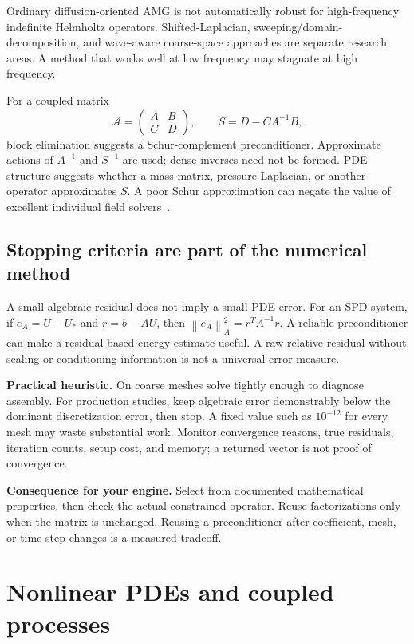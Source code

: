 \documentclass[11pt,a4paper]{article}
\newcommand{\norm}[1]{\left\lVert #1\right\rVert}
\newcommand{\decision}[1]{\par\smallskip\noindent\textcolor{accent}{\textbf{Consequence for your engine.}} #1\par}
\newcommand{\heuristic}{\textcolor{accent}{\textbf{Practical heuristic.}} }
\begin{document}
Ordinary diffusion-oriented AMG is not automatically robust for high-frequency indefinite Helmholtz operators. Shifted-Laplacian, sweeping/domain-decomposition, and wave-aware coarse-space approaches are separate research areas. A method that works well at low frequency may stagnate at high frequency.

For a coupled matrix
\begin{equation}
\mathcal A=\begin{pmatrix}A&B\\C&D\end{pmatrix},\qquad
S=D-CA^{-1}B,
\end{equation}
block elimination suggests a Schur-complement preconditioner. Approximate actions of $A^{-1}$ and $S^{-1}$ are used; dense inverses need not be formed. PDE structure suggests whether a mass matrix, pressure Laplacian, or another operator approximates $S$. A poor Schur approximation can negate the value of excellent individual field solvers~\cite{petscfield}.

\subsection{Stopping criteria are part of the numerical method}
A small algebraic residual does not imply a small PDE error. For an SPD system, if $e_A=U-U_* $ and $r=b-AU$, then $\norm{e_A}_A^2=r^TA^{-1}r$. A reliable preconditioner can make a residual-based energy estimate useful. A raw relative residual without scaling or conditioning information is not a universal error measure.

\heuristic On coarse meshes solve tightly enough to diagnose assembly. For production studies, keep algebraic error demonstrably below the dominant discretization error, then stop. A fixed value such as $10^{-12}$ for every mesh may waste substantial work. Monitor convergence reasons, true residuals, iteration counts, setup cost, and memory; a returned vector is not proof of convergence.

\decision{Select from documented mathematical properties, then check the actual constrained operator. Reuse factorizations only when the matrix is unchanged. Reusing a preconditioner after coefficient, mesh, or time-step changes is a measured tradeoff.}

\section{Nonlinear PDEs and coupled processes}\label{sec:nonlinear}
\end{document}
